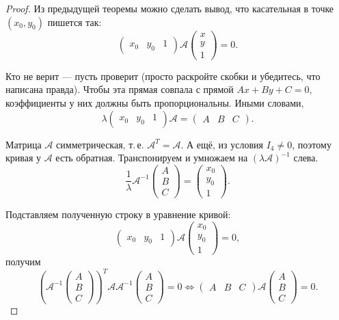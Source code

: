 \begin{proof}
    Из предыдущей теоремы можно сделать вывод, что касательная в точке $(x_0, y_0)$ пишется так:
    $$
    \begin{pmatrix}
        x_0 & y_0 & 1
    \end{pmatrix}\mathcal{A}
    \begin{pmatrix}
        x\\ y\\ 1
    \end{pmatrix} = 0.
    $$

    Кто не верит --- пусть проверит (просто раскройте скобки и убедитесь, что написана правда). Чтобы эта прямая совпала с прямой $Ax + By + C = 0$, коэффициенты у них должны быть пропорциональны. Иными словами,
    $$
    \lambda
    \begin{pmatrix}
        x_0 & y_0 & 1
    \end{pmatrix}\mathcal{A} = 
    \begin{pmatrix}
        A & B & C
    \end{pmatrix}.
    $$

    Матрица $\mathcal{A}$ симметрическая, т.\,е. $\mathcal{A}^T = \mathcal{A}$. А ещё, из условия $I_4 \ne 0$, поэтому кривая у $\mathcal{A}$ есть обратная. Транспонируем и умножаем на $(\lambda\mathcal{A})^{-1}$ слева.
    $$
    \frac{1}{\lambda}\mathcal{A}^{-1}
    \begin{pmatrix}
        A \\ B \\ C
    \end{pmatrix} = 
    \begin{pmatrix}
        x_0 \\ y_0 \\ 1
    \end{pmatrix}.
    $$

    Подставляем полученную строку в уравнение кривой:
    $$
    \begin{pmatrix}
        x_0 & y_0 & 1
    \end{pmatrix}\mathcal{A}
    \begin{pmatrix}
        x_0\\ y_0\\ 1
    \end{pmatrix} = 0,
    $$
    получим
    $$
    \left(
        \mathcal{A}^{-1}
        \begin{pmatrix}
            A\\ B\\ C
        \end{pmatrix}
    \right)^T\mathcal{A}\mathcal{A}^{-1}
    \begin{pmatrix}
        A\\ B\\ C
    \end{pmatrix} = 0 \Leftrightarrow 
    \begin{pmatrix}
        A & B & C
    \end{pmatrix}\mathcal{A}
    \begin{pmatrix}
        A\\ B\\ C
    \end{pmatrix} = 0.
    $$
\end{proof}



